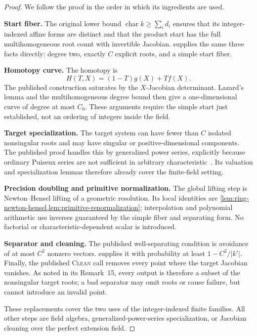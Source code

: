 \documentclass[11pt,a4paper]{article}
\theoremstyle{definition}
\theoremstyle{remark}
\newcommand{\proofstep}[1]{\par\smallskip\noindent\textbf{#1}\enspace}
\begin{document}
\begin{proof}
We follow the proof in the order in which its ingredients are used.

\proofstep{Start fiber.}
The original lower bound
$\operatorname{char}k\ge\sum_i d_i$ ensures that its integer-indexed affine forms are distinct and that the product start has the full multihomogeneous root count with invertible Jacobian.   supplies the same three facts directly: degree two, exactly $C$ explicit roots, and a simple start fiber.

\proofstep{Homotopy curve.}
The homotopy is
\[
 H(T,X)=(1-T)g(X)+Tf(X).
\]
The published construction saturates by the $X$-Jacobian determinant.  Lazard's lemma and the multihomogeneous degree bound then give a one-dimensional curve of degree at most $C_0$.  These arguments require the simple start just established, not an ordering of integers inside the field.

\proofstep{Target specialization.}
The target system can have fewer than $C$ isolated nonsingular roots and may have singular or positive-dimensional components.  The published proof handles this by generalized power series, explicitly because ordinary Puiseux series are not sufficient in arbitrary characteristic~\cite[Sec.~3.4]{SafeySchost2018}.  Its valuation and specialization lemmas therefore already cover the finite-field setting.

\proofstep{Precision doubling and primitive normalization.}
The global lifting step is Newton--Hensel lifting of a geometric resolution.  Its local identities are \cref{lem:ring-newton-hensel,lem:primitive-renormalization}; interpolation and polynomial arithmetic use inverses guaranteed by the simple fiber and separating form.  No factorial or characteristic-dependent scalar is introduced.

\proofstep{Separator and cleaning.}
The published well-separating condition is avoidance of at most $C^2$ nonzero vectors.   supplies it with probability at least $1-C^2/|k'|$.  Finally, the published \textsc{Clean} call removes every point where the target Jacobian vanishes.  As noted in its Remark~15, every output is therefore a subset of the nonsingular target roots; a bad separator may omit roots or cause failure, but cannot introduce an invalid point.

These replacements cover the two uses of the integer-indexed finite families.  All other steps are field algebra, generalized-power-series specialization, or Jacobian cleaning over the perfect extension field.
\end{proof}
\end{document}
